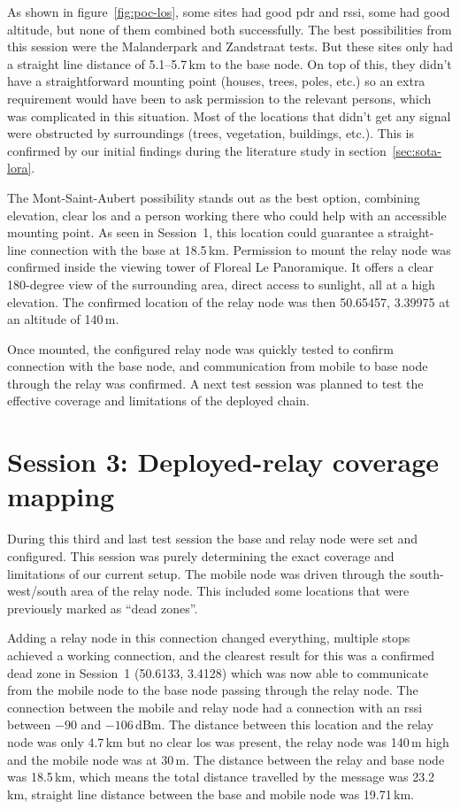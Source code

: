 As shown in figure~\ref{fig:poc-los}, some sites had good \gls{pdr} and \gls{rssi}, some had good altitude, but none of them combined both successfully.
The best possibilities from this session were the Malanderpark and Zandstraat tests. But these sites only had a straight line distance of 5.1--5.7\,km to the base node.
On top of this, they didn't have a straightforward mounting point (houses, trees, poles, etc.) so an extra requirement would have been to ask permission to the relevant persons, which was complicated in this situation.
Most of the locations that didn't get any signal were obstructed by surroundings (trees, vegetation, buildings, etc.). This is confirmed by our initial findings during the literature study in section~\ref{sec:sota-lora}.

The Mont-Saint-Aubert possibility stands out as the best option, combining elevation, clear \gls{los} and a person working there who could help with an accessible mounting point.
As seen in Session~1, this location could guarantee a straight-line connection with the base at 18.5\,km.
Permission to mount the relay node was confirmed inside the viewing tower of Floreal Le Panoramique. It offers a clear 180-degree view of the surrounding area, direct access to sunlight, all at a high elevation.
The confirmed location of the relay node was then 50.65457, 3.39975 at an altitude of 140\,m.

Once mounted, the configured relay node was quickly tested to confirm connection with the base node, and communication from mobile to base node through the relay was confirmed.
A next test session was planned to test the effective coverage and limitations of the deployed chain.

\section{Session 3: Deployed-relay coverage mapping}%
\label{sec:poc-session3}

During this third and last test session the base and relay node were set and configured. This session was purely determining the exact coverage and limitations of our current setup.
The mobile node was driven through the south-west/south area of the relay node. This included some locations that were previously marked as ``dead zones''.

Adding a relay node in this connection changed everything, multiple stops achieved a working connection, and the clearest result for this was a confirmed dead zone in Session~1 (50.6133, 3.4128) which was now able to communicate from the mobile node
to the base node passing through the relay node. The connection between the mobile and relay node had a connection with an \gls{rssi} between $-90$ and $-106$\,dBm. The distance between this location and the relay node was only 4.7\,km but no clear \gls{los} was present, the relay node was 140\,m high and the mobile node was at 30\,m.
The distance between the relay and base node was 18.5\,km, which means the total distance travelled by the message was 23.2\,km, straight line distance between the base and mobile node was 19.71\,km.

